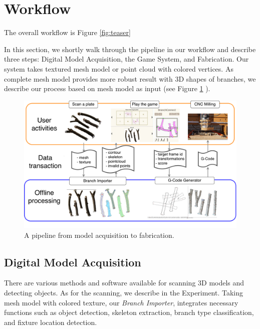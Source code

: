 \section{Workflow}
The overall workflow is  Figure \ref{fig:teaser}

In this section, we shortly walk through the pipeline in our workflow and describe three steps: Digital Model Acquisition, the Game System, and Fabrication. Our system takes textured mesh model or point cloud with colored vertices. As complete mesh model provides more robust result with 3D shapes of branches, we describe our process based on mesh model as input (see Figure \ref{fig:pipeline} ).

\begin{figure}[ht]
  \begin{center}
    \includegraphics[width = 0.4\paperwidth]{images/workflow/pipeline.pdf}
    \caption{A pipeline from model acquisition to fabrication.}
    \label{fig:pipeline}
  \end{center}
\end{figure}

\subsection{Digital Model Acquisition}
There are various methods and software available for scanning 3D models and detecting objects.
As for the scanning, we describe in the Experiment.
Taking mesh model with colored texture, our \textit{Branch Importer}, integrates necessary functions such as object detection, skeleton extraction, branch type classification, and fixture location detection.


